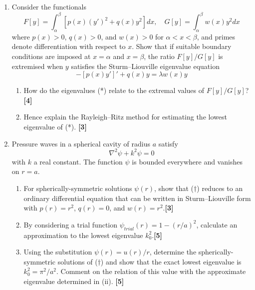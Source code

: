 \documentclass[a4paper]{article}
\begin{document}
\begin{qns}\leavevmode
\begin{enumerate}[label=(\alph*)]
\item Consider the functionals
$$F[y]=\int_\alpha^\beta[p(x)(y')^2+q(x)y^2]dx,\quad G[y]=\int_\alpha^\beta w(x)y^2dx$$
where $p(x) > 0$, $q(x) > 0$, and $w(x) > 0$ for $\alpha < x < \beta$, and primes denote differentiation with respect to $x$. Show that if suitable boundary conditions are imposed at $x=\alpha$ and $x=\beta$, the ratio $F[y]/G[y]$ is extremised when $y$ satisfies the Sturm–Liouville eigenvalue equation
\begin{equation}
    -[p(x)y']'+q(x)y=\lambda w(x)y\tag{*}
\end{equation}
\begin{enumerate}[label=(\roman*)]
\item How do the eigenvalues (*) relate to the extremal values of $F[y]/G[y]$? \hfill \textbf{[4]}
\item Hence explain the Rayleigh–Ritz method for estimating the lowest eigenvalue of (*). \hfill \textbf{[3]}
\end{enumerate}
\item Pressure waves in a spherical cavity of radius $a$ satisfy
\begin{equation}
\nabla^2\psi+k^2\psi=0\tag{\dag} 
\end{equation}
with $k$ a real constant. The function $\psi$ is bounded everywhere and vanishes on $r = a$.
\begin{enumerate}[label=(\roman*)]
\item For spherically-symmetric solutions $\psi(r)$, show that ($\dag$) reduces to an ordinary differential equation that can be written in Sturm–Liouville form with $p(r) = r^2$, $q(r) = 0$, and $w(r) = r^2$.\hfill \textbf{[3]}
\item By considering a trial function  $\psi_{trial}(r) = 1−(r/a)^2$, calculate an approximation to the lowest eigenvalue $k_0^2$.\hfill \textbf{[5]}
\item Using the substitution $\psi(r) = u(r)/r$, determine the spherically-symmetric solutions of ($\dag$) and show that the exact lowest eigenvalue is $k_0^2=\pi^2/a^2$. Comment on the relation of this value with the approximate eigenvalue
determined in (ii). \hfill \textbf{[5]}
\end{enumerate}
\end{enumerate}
\end{qns}
\end{document}
